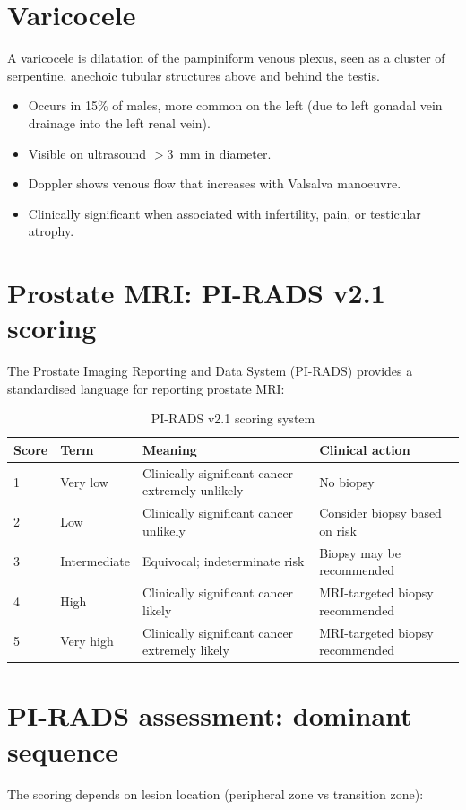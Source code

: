 \section{Varicocele}
A varicocele is dilatation of the pampiniform venous plexus, seen as a cluster of serpentine, anechoic tubular structures above and behind the testis.
\begin{itemize}
    \item Occurs in 15\% of males, more common on the left (due to left gonadal vein drainage into the left renal vein).
    \item Visible on ultrasound $>$3~mm in diameter.
    \item Doppler shows venous flow that increases with Valsalva manoeuvre.
    \item Clinically significant when associated with infertility, pain, or testicular atrophy.
\end{itemize}

\section{Prostate MRI: PI-RADS v2.1 scoring}
The Prostate Imaging Reporting and Data System (PI-RADS) provides a standardised language for reporting prostate MRI:

\begin{table}[h]
\centering
\caption{PI-RADS v2.1 scoring system}
\label{tab:pirads}
\begin{tabular}{@{}p{}p{}p{}p{}@{}}
\hline
\textbf{Score} & \textbf{Term} & \textbf{Meaning} & \textbf{Clinical action} \\
\hline
1 & Very low & Clinically significant cancer extremely unlikely & No biopsy \\
2 & Low & Clinically significant cancer unlikely & Consider biopsy based on risk \\
3 & Intermediate & Equivocal; indeterminate risk & Biopsy may be recommended \\
4 & High & Clinically significant cancer likely & MRI-targeted biopsy recommended \\
5 & Very high & Clinically significant cancer extremely likely & MRI-targeted biopsy recommended \\
\hline
\end{tabular}
\end{table}

\section{PI-RADS assessment: dominant sequence}
The scoring depends on lesion location (peripheral zone vs transition zone):

